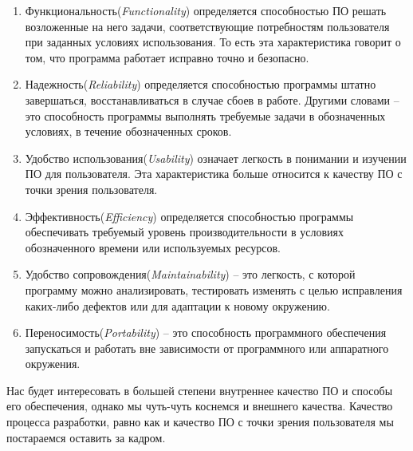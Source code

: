 \begin{enumerate}
  \item Функциональность(\textit{Functionality}) определяется способностью ПО решать возложенные на него задачи, соответствующие потребностям пользователя при заданных условиях использования. То есть эта характеристика говорит о том, что программа работает исправно точно и безопасно.
  \item Надежность(\textit{Reliability}) определяется способностью программы штатно завершаться, восстанавливаться в случае сбоев в работе. Другими словами -- это способность программы выполнять требуемые задачи в обозначенных условиях, в течение обозначенных сроков.
  \item Удобство использования(\textit{Usability}) означает легкость в понимании и изучении ПО для пользователя. Эта характеристика больше относится к качеству ПО с точки зрения пользователя.
  \item Эффективность(\textit{Efficiency}) определяется способностью программы обеспечивать требуемый уровень производительности в условиях обозначенного времени или используемых ресурсов.
  \item Удобство сопровождения(\textit{Maintainability}) -- это легкость, с которой программу можно анализировать, тестировать изменять с целью исправления каких-либо дефектов или для адаптации к новому окружению.
  \item Переносимость(\textit{Portability}) -- это способность программного обеспечения запускаться и работать вне зависимости от программного или аппаратного окружения.
\end{enumerate}

Нас будет интересовать в большей степени внутреннее качество ПО и способы его обеспечения, однако мы чуть-чуть коснемся и внешнего качества. Качество процесса разработки, равно как и качество ПО с точки зрения пользователя мы постараемся оставить за кадром.

